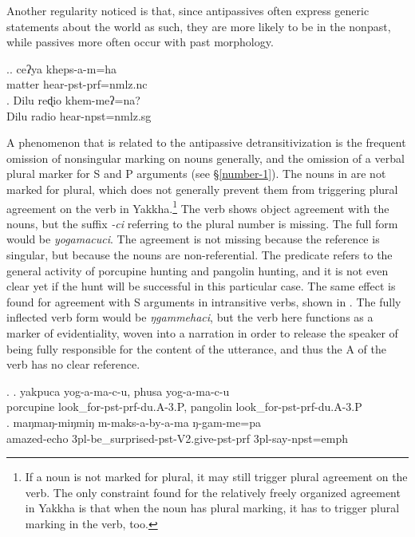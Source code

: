 Another regularity noticed is that, since antipassives often express generic statements about the world as such, they are more likely to be in the nonpast, while passives more often occur with past morphology.

\ex.\ag. ceʔya kheps-a-m=ha\\
matter hear{\sc [3sg]-pst-prf=nmlz.nc}\\
 
\bg. Dilu  reɖio khem-meʔ=na?\\
Dilu radio  hear{\sc [3sg]-npst=nmlz.sg}\\


A  phenomenon that is related to the antipassive detransitivization is the frequent omission of nonsingular marking on nouns generally, and the omission of a verbal plural marker for S and P arguments (see §\ref{number-1}). The nouns in \Next[a] are not marked for plural, which does  not generally prevent them from triggering plural agreement on the verb in Yakkha.\footnote{If a noun is not marked for plural, it may still trigger plural agreement on the verb. The only constraint found for the relatively freely organized agreement in Yakkha is that when the noun has plural marking, it has to trigger plural marking in the verb, too.} The verb shows object agreement with the nouns, but the suffix \emph{-ci} referring to the plural number is missing. The full form would be  \emph{yogamacuci}. The agreement is not missing because the reference is singular, but because the nouns are non-referential. The predicate refers to the general activity of porcupine hunting and pangolin hunting, and it is not even clear yet if the hunt will be successful in this particular case. The same effect is found for agreement with S arguments in intransitive verbs, shown in \Next[b]. The fully inflected verb form would be \emph{ŋgammehaci}, but the verb here functions as a marker of evidentiality, woven into a narration in order to release the speaker of being fully responsible for the content of the utterance, and thus the A of the verb has no clear reference.


\ex. \ag. yakpuca   yog-a-ma-c-u, phusa    yog-a-ma-c-u\\
porcupine   look\_for{\sc -pst-prf-du.A-3.P}, pangolin   look\_for{\sc -pst-prf-du.A-3.P}\\
 
\bg. maŋmaŋ-miŋmiŋ m-maks-a-by-a-ma ŋ-gam-me=pa\\
	amazed{\sc -echo} {\sc 3pl-}be\_surprised{\sc -pst-V2.give-pst-prf} {\sc 3pl-}say{\sc -npst=emph}\\
	 
	


